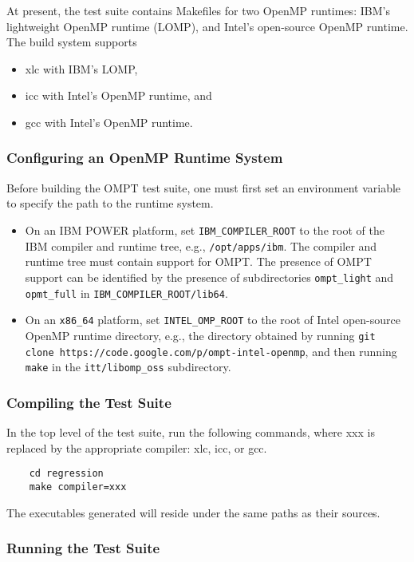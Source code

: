 \documentclass{article}
\begin{document}
At present, the test suite contains Makefiles for two OpenMP runtimes: IBM's lightweight OpenMP runtime (LOMP), and Intel's open-source OpenMP runtime. The build system supports 
\begin{itemize}
\item xlc  with IBM's LOMP,
\item icc with Intel's OpenMP runtime, and
\item gcc with Intel's OpenMP runtime.
\end{itemize}

\subsubsection{Configuring an OpenMP Runtime System}
Before building the OMPT test suite, one must first set an environment variable to specify the path to the runtime system.
\begin{itemize}
\item On an IBM POWER platform, set \verb|IBM_COMPILER_ROOT| to the root of the IBM compiler and runtime tree, e.g., {\tt /opt/apps/ibm}. The compiler and runtime tree must contain support for OMPT. The presence of OMPT support can be identified by the presence of subdirectories \verb|ompt_light| and \verb|opmt_full| in \verb|IBM_COMPILER_ROOT/lib64|.
\item On an \verb|x86_64| platform, set \verb|INTEL_OMP_ROOT| to the root of Intel open-source OpenMP runtime directory, e.g., the directory obtained by running {\tt  git clone https://code.google.com/p/ompt-intel-openmp}, and then running \verb|make| in the  \verb|itt/libomp_oss| subdirectory.
\end{itemize}
\subsubsection{Compiling the Test Suite}
In the top level of the test suite, run the following commands, where xxx is replaced by the appropriate compiler: xlc, icc, or gcc.
    \begin{verbatim}
    cd regression
    make compiler=xxx       
    \end{verbatim}
\noindent The executables generated will reside under the same paths as their sources.
    
\subsubsection{Running the Test Suite}
    
\end{document}
